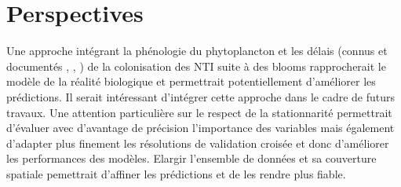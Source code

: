 \section{Perspectives}
Une approche intégrant la phénologie du phytoplancton et les délais (connus et documentés \cite{nicholson2025satellite}, \cite{kauko2021phenology}, \cite{lampe2026differences}) de la colonisation des NTI suite à des blooms rapprocherait le modèle de la réalité biologique et permettrait potentiellement d'améliorer les prédictions. Il serait intéressant d'intégrer cette approche dans le cadre de futurs travaux. Une attention particulière sur le respect de la stationnarité permettrait d'évaluer avec d'avantage de précision l'importance des variables mais également d'adapter plus finement les résolutions de validation croisée et donc d'améliorer les performances des modèles. Elargir l'ensemble de données et sa couverture spatiale pemettrait d'affiner les prédictions et de les rendre plus fiable.  


